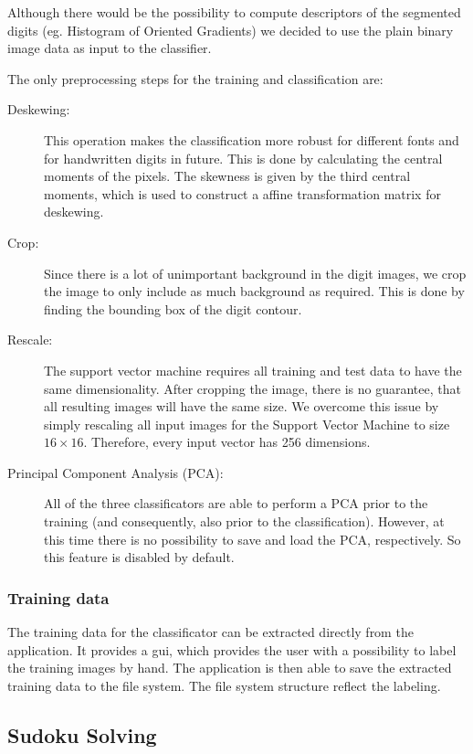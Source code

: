 \documentclass[
a4paper,     %
12pt         %
]{scrartcl}  %
\begin{document}
Although there would be the possibility to compute descriptors of the segmented digits
(eg. Histogram of Oriented Gradients) we decided to use the plain binary image data
as input to the classifier.

The only preprocessing steps for the training and classification are:

\begin{description}
  \item[Deskewing:] This operation makes the classification more robust for different
  fonts and for handwritten digits in future. This is done by calculating the central
  moments of the pixels. The skewness is given by the third central moments, which is
  used to construct a affine transformation matrix for deskewing.
  \item[Crop:] Since there is a lot of unimportant background in the digit images, we
  crop the image to only include as much background as required. This is done by finding
  the bounding box of the digit contour.
  \item[Rescale:] The support vector machine requires all training and test data to have
  the same dimensionality. After cropping the image, there is no guarantee, that all resulting
  images will have the same size. We overcome this issue by simply rescaling all input
  images for the Support Vector Machine to size $16 \times 16$. Therefore, every input
  vector has 256 dimensions.
  \item[Principal Component Analysis (PCA):] All of the three classificators are able to
  perform a PCA prior to the training (and consequently, also prior to the classification).
  However, at this time there is no possibility to save and load the PCA, respectively.
  So this feature is disabled by default. 
\end{description}

\subsubsection{Training data}

The training data for the classificator can be extracted directly from the application. It
provides a gui, which provides the user with a possibility to label the training images
by hand. The application is then able to save the extracted training data to the file system.
The file system structure reflect the labeling.

\subsection{Sudoku Solving}
\end{document}
